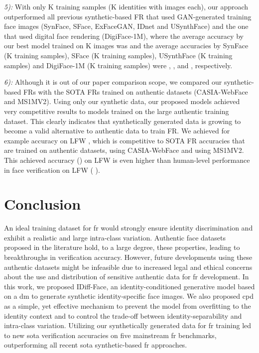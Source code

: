 \documentclass[10pt,twocolumn,letterpaper]{article}
\newcommand{\approachnamewithoutspace}{IDiff-Face}
\begin{document}
\textit{5):} With only K training samples (K identities with  images each), our approach outperformed all previous synthetic-based FR that used GAN-generated training face images (SynFace, SFace, ExFaceGAN, IDnet and USynthFace) and the one that used digital face rendering (DigiFace-1M), where the average accuracy by our best model trained on K images was  and the average accuracies by SynFace (K training samples), SFace (K training samples), USynthFace (K training samples) and DigiFace-1M (K training samples) were , ,  and , respectively.


\textit{6):} Although it is out of our paper comparison scope, we compared our synthetic-based FRs with the SOTA FRs trained on authentic datasets (CASIA-WebFace and MS1MV2).  Using only our synthetic data, our proposed models achieved very competitive results to models trained on the large authentic training dataset. This clearly indicates that synthetically generated data is growing to become a valid alternative to authentic data to train FR. We achieved for example  accuracy on LFW \cite{LFWDatabase}, which is competitive to SOTA FR accuracies that are trained on authentic datasets,  using CASIA-WebFace and  using MS1MV2. This achieved accuracy () on LFW is even higher than human-level performance in face verification on LFW ( \cite{DBLP:conf/iccv/KumarBBN09}).





\vspace{-3mm}
\section{Conclusion}
\vspace{-1mm}
An ideal training dataset for \acrshort{fr} would strongly ensure identity discrimination and exhibit a realistic and large intra-class variation. Authentic face datasets proposed in the literature hold, to a large degree, these properties, leading to breakthroughs in verification accuracy. However, future developments using these authentic datasets might be infeasible due to increased legal and ethical concerns about the use and distribution of sensitive authentic data for \acrshort{fr} development. In this work, we proposed \approachnamewithoutspace, an identity-conditioned generative model based on a \acrshort{dm} to generate synthetic identity-specific face images. We also proposed \acrshort{cpd} as a simple, yet effective mechanism to prevent the model from overfitting to the identity context and to control the trade-off between identity-separability and intra-class variation.
Utilizing our synthetically generated data for \acrshort{fr} training led to new \acrshort{sota} verification accuracies on five mainstream \acrshort{fr} benchmarks, outperforming all recent \acrshort{sota} synthetic-based \acrshort{fr} approaches.
\end{document}
